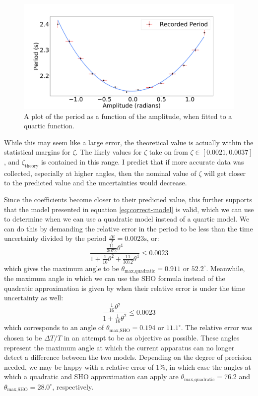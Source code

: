 \documentclass[%
 reprint,
 amsmath,amssymb
 aps,
]{revtex4-2}
\begin{document}
\begin{figure}[!h]
    \includegraphics[width=\linewidth]{Figures/period-vs-amplitude-quartic.png}

    \caption{A plot of the period as a function of the amplitude, when fitted to a quartic function.}
    \label{fig:period-vs-amplitude-quartic}
\end{figure}
While this may seem like a large error, the theoretical value is actually within the statistical margins for $\zeta$. The likely values for $\zeta$ take on from $\zeta \in [0.0021,0.0037]$, and $\zeta_\text{theory}$ is contained in this range. I predict that if more accurate data was collected, especially at higher angles, then the nominal value of $\zeta$ will get closer to the predicted value and the uncertainties would decrease.

Since the coefficients become closer to their predicted value, this further supports that the model presented in equation \ref{eq:correct-model} is valid, which we can use to determine when we can use a quadratic model instead of a quartic model. We can do this by demanding the relative error in the period to be less than the time uncertainty divided by the period $\frac{\Delta t}{T} = 0.0023\si{\second}$, or:
\begin{equation}
    \frac{\frac{11}{3072}\theta^{4}}{1+\frac{1}{16}\theta^{2}+\frac{11}{3072}\theta^{4}} \le 0.0023
    \label{eq:}
\end{equation}
which gives the maximum angle to be $\theta_\text{max,quadratic}=0.911$ or $52.2^\circ$. Meanwhile, the maximum angle in which we can use the SHO formula instead of the quadratic approximation is given by when their relative error is under the time uncertainty as well:
\begin{equation}
    \frac{\frac{1}{16}\theta^{2}}{1+\frac{1}{16}\theta^{2}} \le 0.0023
    \label{eq:}
\end{equation}
which corresponds to an angle of $\theta_\text{max,SHO}=0.194$ or $11.1^\circ$. The relative error was chosen to be $\Delta T/T$ in an attempt to be as objective as possible. These angles represent the maximum angle at which the current apparatus can no longer detect a difference between the two models. Depending on the degree of precision needed, we may be happy with a relative error of $1\%$, in which case the angles at which a quadratic and SHO approximation can apply are $\theta_\text{max,quadratic}=76.2$ and $\theta_\text{max,SHO}=28.0^\circ$, respectively.
\end{document}

